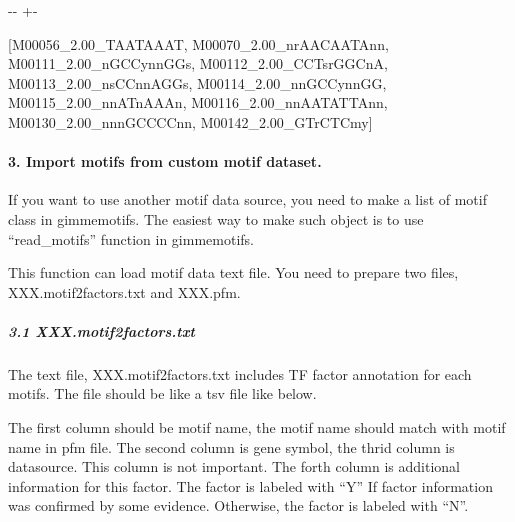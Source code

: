 \documentclass[letterpaper,10pt,english]{sphinxmanual}
\newlength\nbsphinxcodecellspacing
\begin{document}
{

\kern-\sphinxverbatimsmallskipamount\kern-\baselineskip
\kern+\FrameHeightAdjust\kern-\fboxrule
\vspace{\nbsphinxcodecellspacing}

\begin{sphinxVerbatim}[commandchars=\\\{\}]
\llap{\color{nbsphinxout}[39]:\,\hspace{\fboxrule}\hspace{\fboxsep}}[M00056\_2.00\_TAATAAAT,
 M00070\_2.00\_nrAACAATAnn,
 M00111\_2.00\_nGCCynnGGs,
 M00112\_2.00\_CCTsrGGCnA,
 M00113\_2.00\_nsCCnnAGGs,
 M00114\_2.00\_nnGCCynnGG,
 M00115\_2.00\_nnATnAAAn,
 M00116\_2.00\_nnAATATTAnn,
 M00130\_2.00\_nnnGCCCCnn,
 M00142\_2.00\_GTrCTCmy]
\end{sphinxVerbatim}
}


\paragraph{3. Import motifs from custom motif dataset.}
\label{\detokenize{notebooks/02_motif_scan/motif_data_preparation/01_How_to_load_motif_data:3.-Import-motifs-from-custom-motif-dataset.}}
If you want to use another motif data source, you need to make a list of motif class in gimmemotifs. The easiest way to make such object is to use “read\_motifs” function in gimmemotifs.

This function can load motif data text file. You need to prepare two files, XXX.motif2factors.txt and XXX.pfm.


\subparagraph{3.1 XXX.motif2factors.txt}
\label{\detokenize{notebooks/02_motif_scan/motif_data_preparation/01_How_to_load_motif_data:3.1-XXX.motif2factors.txt}}
The text file, XXX.motif2factors.txt includes TF factor annotation for each motifs. The file should be like a tsv file like below.

The first column should be motif name, the motif name should match with motif name in pfm file. The second column is gene symbol, the thrid column is datasource. This column is not important. The forth column is additional information for this factor. The factor is labeled with “Y” If factor information was confirmed by some evidence. Otherwise, the factor is labeled with “N”.
\end{document}

